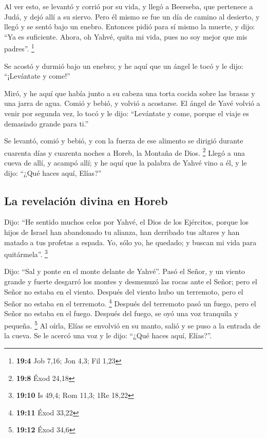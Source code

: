  Al ver esto, se levantó y corrió por su vida, y llegó a
Beerseba, que pertenece a Judá, y dejó allí a su siervo. 
Pero él mismo se fue un día de camino al desierto, y llegó y se sentó
bajo un enebro. Entonces pidió para sí mismo la muerte, y dijo: ``Ya es
suficiente. Ahora, oh Yahvé, quita mi vida, pues no soy mejor que mis
padres''. \footnote{\textbf{19:4} Job 7,16; Jon 4,3; Fil 1,23}

 Se acostó y durmió bajo un enebro; y he aquí que un ángel
le tocó y le dijo: ``¡Levántate y come!''

 Miró, y he aquí que había junto a su cabeza una torta
cocida sobre las brasas y una jarra de agua. Comió y bebió, y volvió a
acostarse.  El ángel de Yavé volvió a venir por segunda
vez, lo tocó y le dijo: ``Levántate y come, porque el viaje es demasiado
grande para ti.''

 Se levantó, comió y bebió, y con la fuerza de ese
alimento se dirigió durante cuarenta días y cuarenta noches a Horeb, la
Montaña de Dios. \footnote{\textbf{19:8} Éxod 24,18} 
Llegó a una cueva de allí, y acampó allí; y he aquí que la palabra de
Yahvé vino a él, y le dijo: ``¿Qué haces aquí, Elías?''

\hypertarget{la-revelaciuxf3n-divina-en-horeb}{%
\subsection{La revelación divina en
Horeb}\label{la-revelaciuxf3n-divina-en-horeb}}

 Dijo: ``He sentido muchos celos por Yahvé, el Dios de
los Ejércitos, porque los hijos de Israel han abandonado tu alianza, han
derribado tus altares y han matado a tus profetas a espada. Yo, sólo yo,
he quedado; y buscan mi vida para quitármela''. \footnote{\textbf{19:10}
  Is 49,4; Rom 11,3; 1Re 18,22}

 Dijo: ``Sal y ponte en el monte delante de Yahvé''. Pasó
el Señor, y un viento grande y fuerte desgarró los montes y desmenuzó
las rocas ante el Señor; pero el Señor no estaba en el viento. Después
del viento hubo un terremoto, pero el Señor no estaba en el terremoto.
\footnote{\textbf{19:11} Éxod 33,22}  Después del
terremoto pasó un fuego, pero el Señor no estaba en el fuego. Después
del fuego, se oyó una voz tranquila y pequeña. \footnote{\textbf{19:12}
  Éxod 34,6}  Al oírla, Elías se envolvió en su manto,
salió y se puso a la entrada de la cueva. Se le acercó una voz y le
dijo: ``¿Qué haces aquí, Elías?''.

